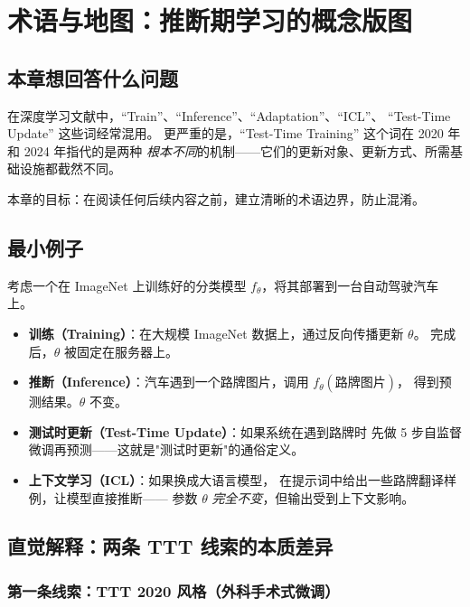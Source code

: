 \chapter{术语与地图：推断期学习的概念版图}
\label{ch:terminology}

\section{本章想回答什么问题}

在深度学习文献中，``Train''、``Inference''、``Adaptation''、``ICL''、
``Test-Time Update'' 这些词经常混用。
更严重的是，``Test-Time Training'' 这个词在 2020 年和 2024 年指代的是两种
\emph{根本不同}的机制——它们的更新对象、更新方式、所需基础设施都截然不同。

本章的目标：在阅读任何后续内容之前，建立清晰的术语边界，防止混淆。

\section{最小例子}

考虑一个在 ImageNet 上训练好的分类模型 $f_\theta$，将其部署到一台自动驾驶汽车上。
\begin{itemize}
  \item \textbf{训练（Training）}：在大规模 ImageNet 数据上，通过反向传播更新 $\theta$。
        完成后，$\theta$ 被固定在服务器上。
  \item \textbf{推断（Inference）}：汽车遇到一个路牌图片，调用 $f_\theta(\text{路牌图片})$，
        得到预测结果。$\theta$ 不变。
  \item \textbf{测试时更新（Test-Time Update）}：如果系统在遇到路牌时
        先做 5 步自监督微调再预测——这就是"测试时更新"的通俗定义。
  \item \textbf{上下文学习（ICL）}：如果换成大语言模型，
        在提示词中给出一些路牌翻译样例，让模型直接推断——
        参数 $\theta$ \emph{完全不变}，但输出受到上下文影响。
\end{itemize}

\section{直觉解释：两条 TTT 线索的本质差异}

\subsection*{第一条线索：TTT 2020 风格（外科手术式微调）}

